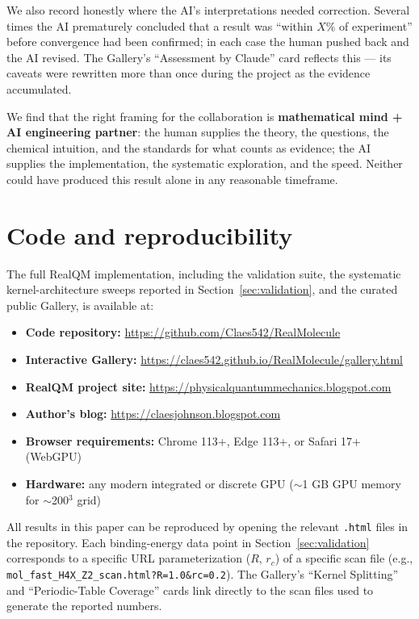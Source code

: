 \documentclass[11pt]{article}
\begin{document}
We also record honestly where the AI's interpretations needed correction. Several times the AI prematurely concluded that a result was ``within $X\%$ of experiment'' before convergence had been confirmed; in each case the human pushed back and the AI revised. The Gallery's ``Assessment by Claude'' card reflects this --- its caveats were rewritten more than once during the project as the evidence accumulated.

We find that the right framing for the collaboration is \textbf{mathematical mind + AI engineering partner}: the human supplies the theory, the questions, the chemical intuition, and the standards for what counts as evidence; the AI supplies the implementation, the systematic exploration, and the speed. Neither could have produced this result alone in any reasonable timeframe.

\section{Code and reproducibility}\label{sec:code}

The full RealQM implementation, including the validation suite, the systematic kernel-architecture sweeps reported in Section~\ref{sec:validation}, and the curated public Gallery, is available at:

\begin{itemize}
\item \textbf{Code repository:} \url{https://github.com/Claes542/RealMolecule}
\item \textbf{Interactive Gallery:} \url{https://claes542.github.io/RealMolecule/gallery.html}
\item \textbf{RealQM project site:} \url{https://physicalquantummechanics.blogspot.com}
\item \textbf{Author's blog:} \url{https://claesjohnson.blogspot.com}
\item \textbf{Browser requirements:} Chrome 113+, Edge 113+, or Safari 17+ (WebGPU)
\item \textbf{Hardware:} any modern integrated or discrete GPU ($\sim$1 GB GPU memory for $\sim$200$^3$ grid)
\end{itemize}

All results in this paper can be reproduced by opening the relevant \texttt{.html} files in the repository. Each binding-energy data point in Section~\ref{sec:validation} corresponds to a specific URL parameterization ($R$, $r_c$) of a specific scan file (e.g., \texttt{mol\_fast\_H4X\_Z2\_scan.html?R=1.0\&rc=0.2}). The Gallery's ``Kernel Splitting'' and ``Periodic-Table Coverage'' cards link directly to the scan files used to generate the reported numbers.
\end{document}
